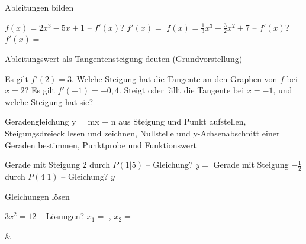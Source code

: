 \setcounter{aufgabe}{0}

\begin{aufgabe}{Ableitungen bilden}
\begin{teile}
\teil $f(x) = 2x^3 - 5x + 1$ – $f'(x)$? $f'(x) =$ \leerfeld
\teil $f(x) = \frac{1}{3}x^3 - \frac{3}{2}x^2 + 7$ – $f'(x)$? $f'(x) =$ \leerfeld
\end{teile}
\end{aufgabe}

\begin{aufgabe}{Ableitungswert als Tangentensteigung deuten (Grundvorstellung)}
\begin{teile}
\teil Es gilt $f'(2) = 3$. Welche Steigung hat die Tangente an den Graphen von $f$ bei $x = 2$? \leerfeld
\teil Es gilt $f'(-1) = -0{,}4$. Steigt oder fällt die Tangente bei $x = -1$, und welche Steigung hat sie? \leerfeld
\end{teile}
\end{aufgabe}

\begin{aufgabe}{Geradengleichung y = mx + n aus Steigung und Punkt aufstellen, Steigungsdreieck lesen und zeichnen, Nullstelle und y-Achsenabschnitt einer Geraden bestimmen, Punktprobe und Funktionswert}
\begin{teile}
\teil Gerade mit Steigung $2$ durch $P(1 | 5)$ – Gleichung? $y =$ \leerfeld
\teil Gerade mit Steigung $-\frac{1}{2}$ durch $P(4 | 1)$ – Gleichung? $y =$ \leerfeld
\end{teile}
\end{aufgabe}

\begin{aufgabe}{Gleichungen lösen}
\begin{teile}
\teil $3x^2 = 12$ – Lösungen? $x_1 =$ \leerfeld , $x_2 =$ \leerfeld
\end{teile}
\begin{gleichungsraster}[2]
 & \\
\end{gleichungsraster}
\end{aufgabe}

